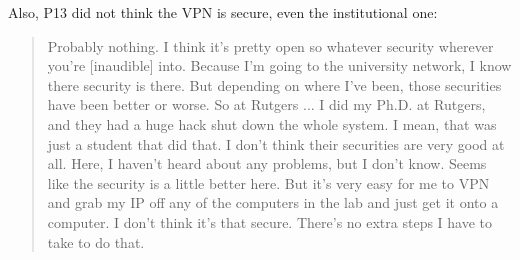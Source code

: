 Also, P13 did not think the VPN is secure, even the institutional one:
\begin{quote}Probably nothing. I think it's pretty open so whatever security
wherever you're [inaudible] into. Because I'm going to the university network,
I know there security is there. But depending on where I've been, those
securities have been better or worse. So at Rutgers ... I did my Ph.D. at
Rutgers, and they had a huge hack shut down the whole system. I mean, that was
just a student that did that. I don't think their securities are very good at
all. Here, I haven't heard about any problems, but I don't know. Seems like
the security is a little better here. But it's very easy for me to VPN and
grab my IP off any of the computers in the lab and just get it onto a
computer. I don't think it's that secure. There's no extra steps I have to
take to do that.\end{quote}